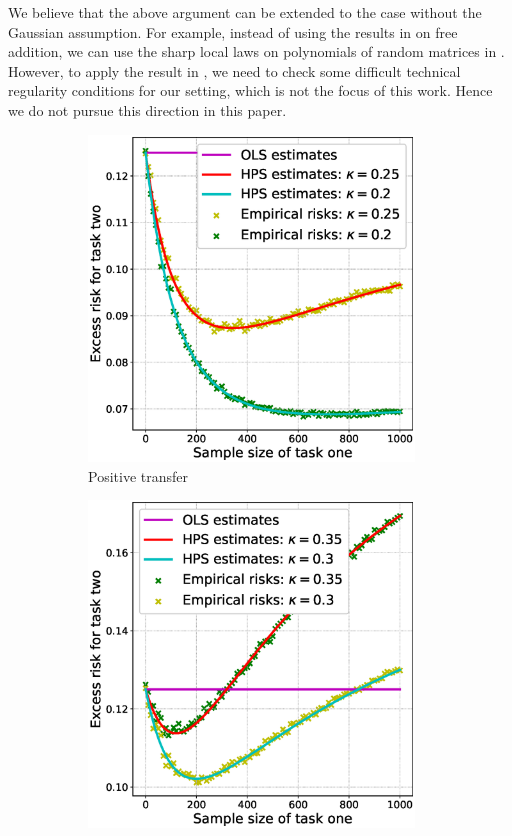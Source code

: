 We believe that the above argument can be extended to the case without the Gaussian assumption. For example, instead of using the results in \cite{BES_free1,BES_free2} on free addition, we can use the sharp local laws on polynomials of random matrices in \cite{EKN_poly}. However, to apply the result in \cite{EKN_poly}, we need to check some difficult technical regularity conditions for our setting, which is not the focus of this work. Hence we do not pursue this direction in this paper.

\begin{figure}[!t]
	\begin{subfigure}[b]{0.33\textwidth}
		\centering
		\includegraphics[width=0.95\textwidth]{figures/model_shift_positive.eps}
		\caption{Positive transfer}
		\label{fig_sec5_covariate}
	\end{subfigure}\hfill%
	\begin{subfigure}[b]{0.33\textwidth}
		\centering
		\includegraphics[width=0.95\textwidth]{figures/model_shift_transition.eps}

\end{subfigure}
\end{figure}
